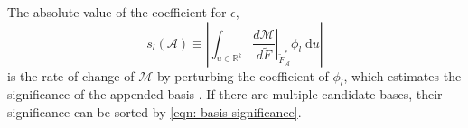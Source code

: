 The absolute value of the coefficient for $\epsilon$,
\begin{equation}
    s_l(\mathcal{A}) \equiv \left|\int_{u\in \mathbb{R}^k} \left.\frac{d\mathcal{M}}{d \tilde{F}}
    \right|_{\tilde{F}_\mathcal{A}^*} \phi_l \; \textrm{d} u \right|
    \label{eqn: basis significance}
\end{equation}
is the rate of change of $\mathcal{M}$ by perturbing the coefficient of $\phi_l$, which
estimates the significance of the appended basis \cite{weight selection}. 
If there are multiple candidate bases, their significance can be sorted by
\eqref{eqn: basis significance}.\\


